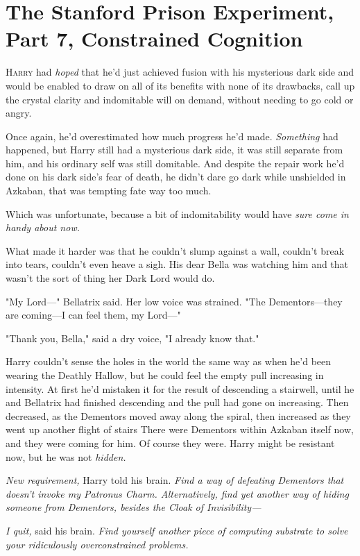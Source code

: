 \chapter{The Stanford Prison Experiment, Part 7, Constrained Cognition}

\lettrine{H}{arry} had
\emph{hoped} that he'd just achieved fusion with his mysterious dark side and
would be enabled to draw on all of its benefits with none of its drawbacks,
call up the crystal clarity and indomitable will on demand, without needing to
go cold or angry.

Once again, he'd overestimated how much progress he'd made. \emph{Something}
had happened, but Harry still had a mysterious dark side, it was still separate
from him, and his ordinary self was still domitable. And despite the repair
work he'd done on his dark side's fear of death, he didn't dare go dark while
unshielded in Azkaban, that was tempting fate way too much.

Which was unfortunate, because a bit of indomitability would have \emph{sure
come in handy about now.}

What made it harder was that he couldn't slump against a wall, couldn't break
into tears, couldn't even heave a sigh. His dear Bella was watching him and
that wasn't the sort of thing her Dark Lord would do.

"My Lord\mbox{---}" Bellatrix said. Her low voice was strained. "The Dementors---they
are coming---I can feel them, my Lord\mbox{---}"

"Thank you, Bella," said a dry voice, "I already know that."

Harry couldn't sense the holes in the world the same way as when he'd been
wearing the Deathly Hallow, but he could feel the empty pull increasing in
intensity. At first he'd mistaken it for the result of descending a stairwell,
until he and Bellatrix had finished descending and the pull had gone on
increasing. Then decreased, as the Dementors moved away along the spiral, then
increased as they went up another flight of stairs{\el} There were Dementors
within Azkaban itself now, and they were coming for him. Of course they were.
Harry might be resistant now, but he was not \emph{hidden.}

\emph{New requirement,} Harry told his brain. \emph{Find a way of defeating
Dementors that doesn't invoke my Patronus Charm. Alternatively, find yet
another way of hiding someone from Dementors, besides the Cloak of
Invisibility---}

\emph{I quit,} said his brain. \emph{Find yourself another piece of computing
substrate to solve your ridiculously overconstrained problems.}


